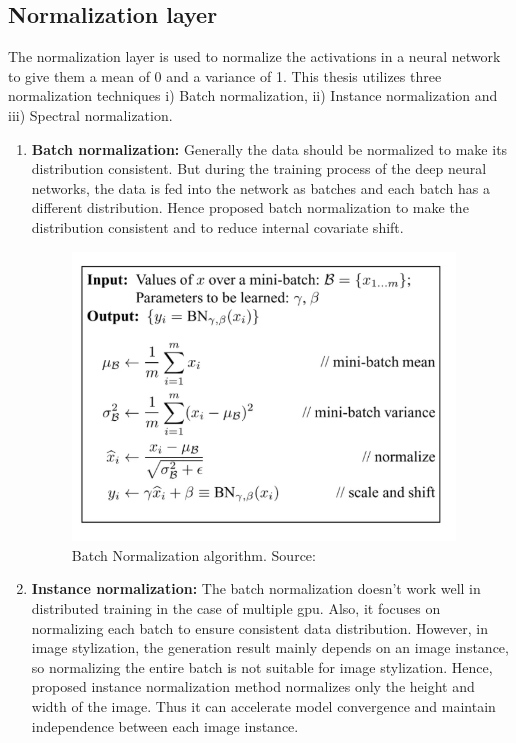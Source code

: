 \subsection*{Normalization layer}
The normalization layer is used to normalize the activations in a neural network to give them a mean of 0 and a variance of 1. This thesis utilizes three normalization techniques i) Batch normalization, ii) Instance normalization and iii) Spectral normalization. 
\begin{enumerate}
\item \textbf{Batch normalization:} Generally the data should be normalized to make its distribution consistent. But during the training process of the deep neural networks, the data is fed into the network as batches and each batch has a different distribution. Hence \cite{ioffe2015batch} proposed batch normalization to make the distribution consistent and to reduce internal covariate shift.
\begin{figure}[H]
\centering
\includegraphics[width=4in,scale=1]{images/bnn.png}
\caption[Batch normalization algorithm]{Batch Normalization algorithm. Source: \citep{ioffe2015batch} }
\label{fig:bn}
\end{figure}
\item \textbf{Instance normalization:} The batch normalization doesn’t work well in distributed training in the case of multiple \gls{gpu}. Also, it focuses on normalizing each batch to ensure consistent data distribution. However, in image stylization, the generation result mainly depends on an image instance, so normalizing the entire batch is not suitable for image stylization. Hence, \cite{ulyanov2016instance} proposed instance normalization method normalizes only the height and width of the image. Thus it can accelerate model convergence and maintain independence between each image instance.

\end{enumerate}
